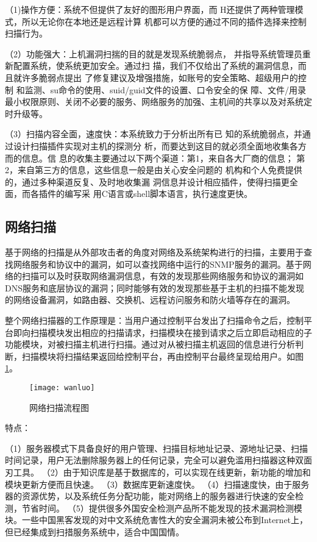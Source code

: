 \documentclass{article}
\begin{document}
（1)操作方便：系统不但提供了友好的图形用户界面，而
H还提供了两种管理模式，所以无论你在本地还是远程计算
机都可以方便的通过不同的插件选择来控制扫描行为。

（2）功能强大：上机漏洞扫揣的目的就是发现系统脆弱点，
并指导系统管理员重新配置系统，使系统更加安全。通过扫
描，我们不仅给出了系统的漏洞信息，而且就许多脆弱点提出
了修复建议及增强措施，如账号的安全策略、超级用户的控制
和监测、su命令的使用、suid/guid文件的设置、口令安全的保
障、文件/用录最小权限原则、关闭不必要的服务、网络服务的加强、主机间的共享以及对系统定时升级等。

（3）扫描内容全面，速度快：本系统致力于分析出所有已
知的系统脆弱点，并通过设计扫描插件实现对主机的探测分
析，而要达到这目的就必须全面地收集各方而的信息。信
息的收集主要通过以下两个渠道：第1，来自各大厂商的信息；
第2，来自第三方的信息，这些信息一般是由关心安全问题的
机构和个人免费提供的，通过多种渠道反复、及时地收集漏
洞信息并设计相应插件，使得扫描更全面，而各插件的编写采
用C语言或shell脚本语言，执行速度更快。

\subsection{网络扫描}
基于网络的扫描是从外部攻击者的角度对网络及系统架构进行的扫描，主要用于查找网络服务和协议中的漏洞，如可以查找网络中运行的SNMP服务的漏洞。基于网络的扫描可以及时获取网络漏洞信息，有效的发现那些网络服务和协议的漏洞如DNS服务和底层协议的漏洞；同时能够有效的发现那些基于主机的扫描不能发现的网络设备漏洞，如路由器、交换机、远程访问服务和防火墙等存在的漏洞。\citep{Xu2010CANVuS}



整个网络扫描器的工作原理是：当用户通过控制平台发出了扫描命令之后，控制平台即向扫描模块发出相应的扫描请求，扫描模块在接到请求之后立即启动相应的子功能模块，对被扫描主机进行扫描。通过对从被扫描主机返回的信息进行分析判断，扫描模块将扫描结果返回给控制平台，再由控制平台最终呈现给用户。如图\ref{fig:24}。
    \begin{figure}[H]
	\centering
	\texttt{[image: wanluo]}
	\caption{网络扫描流程图}
	\label{fig:24}
    \end{figure}
特点：

（1）服务器模式下具备良好的用户管理、扫描目标地址记录、源地址记录、扫描时间记录，用户无法删除服务器上的任何记录，完全可以避免滥用扫描器这种双面刃工具。
（2）由于知识库是基于数据库的，可以实现在线更新，新功能的增加和模块更新方便而且快速。
（3）数据库更新速度快。
（4）扫描速度快，由于服务器的资源优势，以及系统任务分配功能，能对网络上的服务器进行快速的安全检测，节省时间。
（5）提供很多外国安全检测产品所不能发现的技术漏洞检测模块。一些中国黑客发现的对中文系统危害性大的安全漏洞未被公布到Internet上，但已经集成到扫措服务系统中，适合中国国情。
\end{document}
